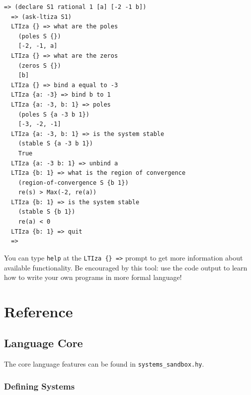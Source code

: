 \documentclass[11pt,letter]{article}
\begin{document}
\begin{lstlisting}[gobble=2]
  => (declare S1 rational 1 [a] [-2 -1 b])
  => (ask-ltiza S1)
  LTIza {} => what are the poles
    (poles S {})
    [-2, -1, a]
  LTIza {} => what are the zeros
    (zeros S {})
    [b]
  LTIza {} => bind a equal to -3
  LTIza {a: -3} => bind b to 1
  LTIza {a: -3, b: 1} => poles
    (poles S {a -3 b 1})
    [-3, -2, -1]
  LTIza {a: -3, b: 1} => is the system stable
    (stable S {a -3 b 1})
    True
  LTIza {a: -3 b: 1} => unbind a
  LTIza {b: 1} => what is the region of convergence
    (region-of-convergence S {b 1})
    re(s) > Max(-2, re(a))
  LTIza {b: 1} => is the system stable
    (stable S {b 1})
    re(a) < 0
  LTIza {b: 1} => quit
  =>
\end{lstlisting}

You can type \lstinline!help! at the \lstinline!LTIza {} =>! prompt to get more information about available functionality.
Be encouraged by this tool: use the code output to learn how to write your own programs in more formal language!

\section{Reference}

\subsection{Language Core}

The core language features can be found in \lstinline!systems_sandbox.hy!.

\subsubsection{Defining Systems}
\end{document}
